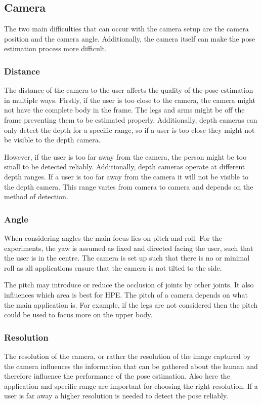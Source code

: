 \subsection{Camera}
\label{sec:camera}

The two main difficulties that can occur with the camera setup are the camera position and the camera angle. Additionally, the camera itself can make the pose estimation process more difficult. 

\subsubsection{Distance}

The distance of the camera to the user affects the quality of the pose estimation in multiple ways. Firstly, if the user is too close to the camera, the camera might not have the complete body in the frame. The legs and arms might be off the frame preventing them to be estimated properly. Additionally, depth cameras can only detect the depth for a specific range, so if a user is too close they might not be visible to the depth camera.

However, if the user is too far away from the camera, the person might be too small to be detected reliably. Additionally, depth cameras operate at different depth ranges. If a user is too far away from the camera it will not be visible to the depth camera. This range varies from camera to camera and depends on the method of detection.

\subsubsection{Angle}

When considering angles the main focus lies on pitch and roll. For the experiments, the yaw is assumed as fixed and directed facing the user, such that the user is in the centre. The camera is set up such that there is no or minimal roll as all applications ensure that the camera is not tilted to the side.

The pitch may introduce or reduce the occlusion of joints by other joints. It also influences which area is best for HPE. The pitch of a camera depends on what the main application is. For example, if the legs are not considered then the pitch could be used to focus more on the upper body.

\subsubsection{Resolution}

The resolution of the camera, or rather the resolution of the image captured by the camera influences the information that can be gathered about the human and therefore influence the performance of the pose estimation. Also here the application and specific range are important for choosing the right resolution. If a user is far away a higher resolution is needed to detect the pose reliably.
